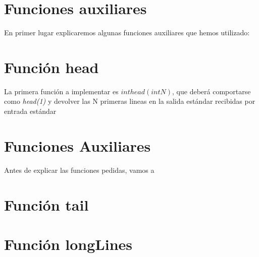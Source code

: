 \chapter*{Funciones auxiliares}
En primer lugar explicaremos algunas funciones auxiliares que hemos utilizado:
\chapter*{Función head}
La primera función a implementar es $int head(int N)$, que deberá comportarse como \textit{head(1)} y devolver las N primeras lineas en la salida estándar recibidas por entrada estándar

\chapter*{Funciones Auxiliares}
Antes de explicar las funciones pedidas, vamos a 
\chapter*{Función tail}


\chapter*{Función longLines}
